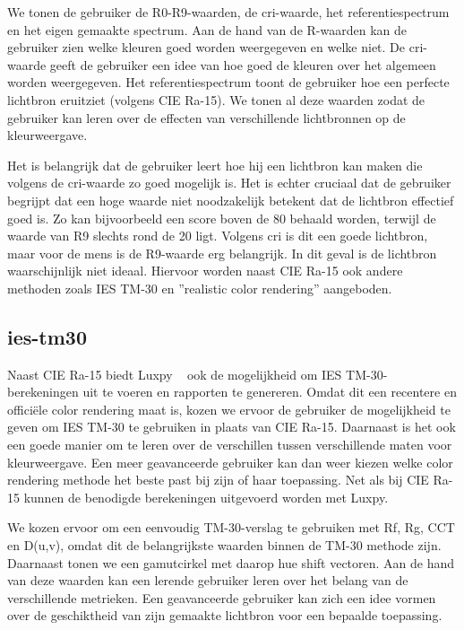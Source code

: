 We tonen de gebruiker de R0-R9-waarden, de \gls{cri}-waarde, het referentiespectrum en het eigen gemaakte spectrum. Aan de hand van de R-waarden kan de gebruiker zien welke kleuren goed worden weergegeven en welke niet. De \gls{cri}-waarde geeft de gebruiker een idee van hoe goed de kleuren over het algemeen worden weergegeven. Het referentiespectrum toont de gebruiker hoe een perfecte lichtbron eruitziet (volgens CIE Ra-15). We tonen al deze waarden zodat de gebruiker kan leren over de effecten van verschillende lichtbronnen op de kleurweergave.

Het is belangrijk dat de gebruiker leert hoe hij een lichtbron kan maken die volgens de \gls{cri}-waarde zo goed mogelijk is. Het is echter cruciaal dat de gebruiker begrijpt dat een hoge waarde niet noodzakelijk betekent dat de lichtbron effectief goed is. Zo kan bijvoorbeeld een score boven de 80 behaald worden, terwijl de waarde van R9 slechts rond de 20 ligt. Volgens \gls{cri} is dit een goede lichtbron, maar voor de mens is de R9-waarde erg belangrijk. In dit geval is de lichtbron waarschijnlijk niet ideaal. Hiervoor worden naast CIE Ra-15 ook andere methoden zoals IES TM-30 en ''realistic color rendering'' aangeboden.

\subsection{ies-tm30}

Naast CIE Ra-15 biedt Luxpy ~\cite{smetTutorialLuxPyPython2020} ook de mogelijkheid om IES TM-30-berekeningen uit te voeren en rapporten te genereren. Omdat dit een recentere en offici\"ele color rendering maat is, kozen we ervoor de gebruiker de mogelijkheid te geven om IES TM-30 te gebruiken in plaats van CIE Ra-15. Daarnaast is het ook een goede manier om te leren over de verschillen tussen verschillende maten voor kleurweergave. Een meer geavanceerde gebruiker kan dan weer kiezen welke color rendering methode het beste past bij zijn of haar toepassing. Net als bij CIE Ra-15 kunnen de benodigde berekeningen uitgevoerd worden met Luxpy.

We kozen ervoor om een eenvoudig TM-30-verslag te gebruiken met Rf, Rg, CCT en D(u,v), omdat dit de belangrijkste waarden binnen de TM-30 methode zijn. Daarnaast tonen we een gamutcirkel met daarop hue shift vectoren. Aan de hand van deze waarden kan een lerende gebruiker leren over het belang van de verschillende metrieken. Een geavanceerde gebruiker kan zich een idee vormen over de geschiktheid van zijn gemaakte lichtbron voor een bepaalde toepassing.

